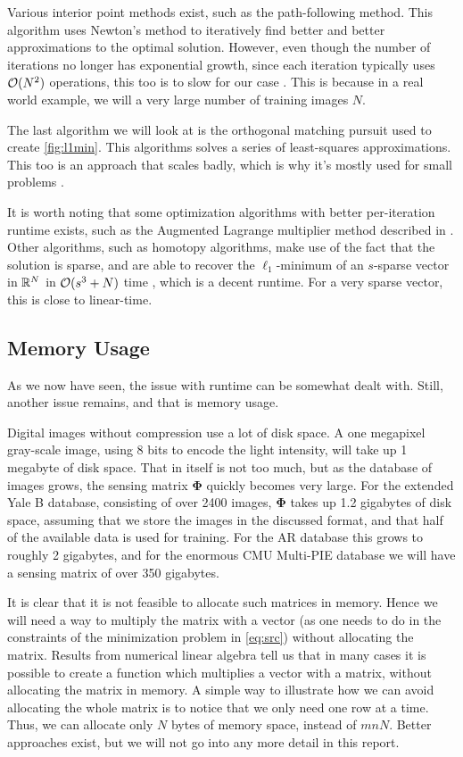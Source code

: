 Various interior point methods exist, such as the path-following method. This algorithm uses Newton's method to iteratively find better and better approximations to the optimal solution. However, even though the number of iterations no longer has exponential growth, since each iteration typically uses $ \mathcal{O}(N^{2}) $ operations, this too is to slow for our case \cite[Section~12.6]{eldar12theoryapplic}. This is because in a real world example, we will a very large number of training images $ N $.

The last algorithm we will look at is the orthogonal matching pursuit used to create \cref{fig:l1min}. This algorithms solves a series of least-squares approximations. This too is an approach that scales badly, which is why it's mostly used for small problems \cite[Secion~3.2]{foucart13intro}.

It is worth noting that some optimization algorithms with better per-iteration runtime exists, such as the Augmented Lagrange multiplier method described in \cite[Alg.~12.2]{foucart13intro}. Other algorithms, such as homotopy algorithms, make use of the fact that the solution is sparse, and are able to recover the $ \ell_{1} $-minimum of an $ s $-sparse vector in $ \mathbb{R}^{N} $ in $ \mathcal{O}(s^{3} + N) $ time \cite{wright09facerecog}, which is a decent runtime. For a very sparse vector, this is close to linear-time. 



\subsection{Memory Usage}
As we now have seen, the issue with runtime can be somewhat dealt with. Still, another issue remains, and that is memory usage. 

Digital images without compression use a lot of disk space. A one megapixel gray-scale image, using 8 bits to encode the light intensity, will take up 1 megabyte of disk space. That in itself is not too much, but as the database of images grows, the sensing matrix $ \mathbf{\Phi} $ quickly becomes very large. For the extended Yale B database, consisting of over 2400 images, $ \mathbf{\Phi} $ takes up 1.2 gigabytes of disk space, assuming that we store the images in the discussed format, and that half of the available data is used for training. For the AR database this grows to roughly 2 gigabytes, and for the enormous CMU Multi-PIE database we will have a sensing matrix of over 350 gigabytes. 

It is clear that it is not feasible to allocate such matrices in memory. Hence we will need a way to multiply the matrix with a vector (as one needs to do in the constraints of the minimization problem in \eqref{eq:src}) without allocating the matrix. Results from numerical linear algebra tell us that in many cases it is possible to create a function which multiplies a vector with a matrix, without allocating the matrix in memory. A simple way to illustrate how we can avoid allocating the whole matrix is to notice that we only need one row at a time. Thus, we can allocate only $ N $ bytes of memory space, instead of $ mnN $. Better approaches exist, but we will not go into any more detail in this report. 

